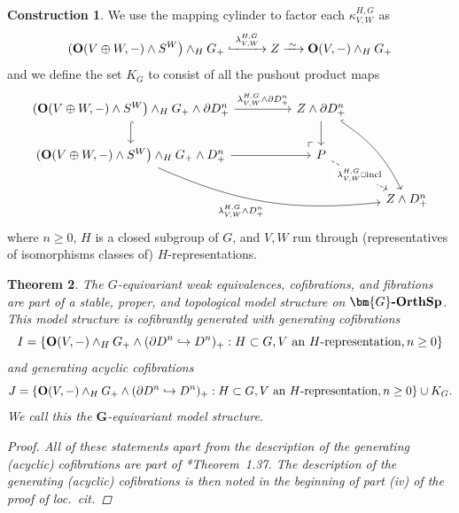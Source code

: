 \documentclass[reqno]{memo-l}
\theoremstyle{mythm}
\newtheorem{thm}{Theorem}[section]
\theoremstyle{definition}
\newtheorem{constr}[thm]{Construction}
\numberwithin{equation}{section}
\newcommand{\ppo}{\mathbin{\raise.25pt\hbox{\scalebox{.67}{$\square$}}}}
\newcommand{\cat}[1]{\textbf{\textup{#1}}}
\let\smashp=\wedge
\newcommand{\incl}{{\mathop{\textup{incl}}}}
\newcommand{\iso}{\xrightarrow{\;\smash{\raisebox{-0.25ex}{\ensuremath{\scriptstyle\sim}}}\;}}
\newcommand{\Gosp}[1]{\cat{$\bm{#1}$-OrthSp}}
\begin{document}
\begin{constr}
    We use the mapping cylinder to factor each $\kappa_{V,W}^{H,G}$ as
    \[
        (\cat{O}(V\oplus W,-)\smashp S^W\big)\smashp_HG_+\lhook\joinrel\xrightarrow{\;\lambda_{V,W}^{H,G}\;} Z \iso \cat{O}(V,-)\smashp_HG_+ 
    \]
    and we define the set $K_G$ to consist of all the pushout product maps
    \[
        \begin{tikzcd}
            (\cat{O}(V\oplus W,-)\smashp S^W\big)\smashp_HG_+\smashp\partial D^n_+\arrow[r,"\lambda_{V,W}^{H,G}\smashp\partial D^n_+"]\arrow[d,hook] &[2.2em] Z\smashp\partial D^n_+\arrow[d]\arrow[ddr,hook, bend left=15pt]\\
            (\cat{O}(V\oplus W,-)\smashp S^W\big)\smashp_HG_+\smashp D^n_+\arrow[r]\arrow[drr,bend right=15pt,"\lambda_{V,W}^{H,G}\smashp D^n_+"'] & \arrow[from=ul,phantom,"\ulcorner"{very near end}",xshift=1.3em,yshift=.2em]P\arrow[dr,dashed,"\lambda_{V,W}^{H,G}\ppo\incl"{description}]\\
            && Z\smashp D^n_+
        \end{tikzcd}
    \]
    where $n\ge 0$, $H$ is a closed subgroup of $G$, and $V,W$ run through (representatives of isomorphisms classes of) $H$-representations.
\end{constr}

\begin{thm}
    The $G$-equivariant weak equivalences, cofibrations, and fibrations are part of a stable, proper, and topological model structure on $\Gosp{G}$. This model structure is cofibrantly generated with generating cofibrations
    \[
        I=\{\cat{O}(V,-)\smashp_H G_+\smashp(\partial D^n\hookrightarrow D^n)_+ : \text{$H\subset G$,\,$V$ an $H$-representation,\,$n\ge0$}\}
    \]
    and generating acyclic cofibrations
    \[
        J\hskip0pt minus 1pt=\hskip 0pt minus 1pt\{\cat{O}(V,-)\smashp_H G_+\smashp(\partial D^n\hskip0pt minus 2pt\hookrightarrow\hskip0pt minus 2pt D^n)_+\hskip0pt minus 1pt :\hskip 0pt minus 1pt \text{$H\subset G$,\,$V$ an $H$-representation,\,$n\ge0$}\}\cup K_G.
    \]
    We call this the \emph{$\bm G$-equivariant model structure}.
    \begin{proof}
        All of these statements apart from the description of the generating (acyclic) cofibrations are part of \cite{DHLPS2019Proper}*{Theorem~1.37}. The description of the generating (acyclic) cofibrations is then noted in the beginning of part (iv) of the proof of \emph{loc.\ cit.}
    \end{proof}
\end{thm}
\end{document}
